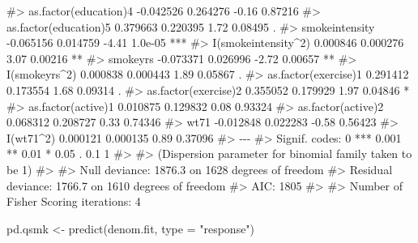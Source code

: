 \documentclass[
  10pt,
  a4paper,
]{book}
\newenvironment{Shaded}{\begin{snugshade}}{\end{snugshade}}
\newcommand{\AttributeTok}[1]{\textcolor[rgb]{0.40,0.45,0.13}{#1}}
\newcommand{\CommentTok}[1]{\textcolor[rgb]{0.37,0.37,0.37}{#1}}
\newcommand{\FunctionTok}[1]{\textcolor[rgb]{0.28,0.35,0.67}{#1}}
\newcommand{\NormalTok}[1]{\textcolor[rgb]{0.00,0.46,0.62}{#1}}
\newcommand{\OtherTok}[1]{\textcolor[rgb]{0.00,0.46,0.62}{#1}}
\newcommand{\StringTok}[1]{\textcolor[rgb]{0.13,0.47,0.30}{#1}}
\begin{document}
\begin{Shaded}
\begin{Highlighting}[]
\CommentTok{\#\textgreater{} as.factor(education)4 {-}0.042526   0.264276   {-}0.16  0.87216    }
\CommentTok{\#\textgreater{} as.factor(education)5  0.379663   0.220395    1.72  0.08495 .  }
\CommentTok{\#\textgreater{} smokeintensity        {-}0.065156   0.014759   {-}4.41  1.0e{-}05 ***}
\CommentTok{\#\textgreater{} I(smokeintensity\^{}2)    0.000846   0.000276    3.07  0.00216 ** }
\CommentTok{\#\textgreater{} smokeyrs              {-}0.073371   0.026996   {-}2.72  0.00657 ** }
\CommentTok{\#\textgreater{} I(smokeyrs\^{}2)          0.000838   0.000443    1.89  0.05867 .  }
\CommentTok{\#\textgreater{} as.factor(exercise)1   0.291412   0.173554    1.68  0.09314 .  }
\CommentTok{\#\textgreater{} as.factor(exercise)2   0.355052   0.179929    1.97  0.04846 *  }
\CommentTok{\#\textgreater{} as.factor(active)1     0.010875   0.129832    0.08  0.93324    }
\CommentTok{\#\textgreater{} as.factor(active)2     0.068312   0.208727    0.33  0.74346    }
\CommentTok{\#\textgreater{} wt71                  {-}0.012848   0.022283   {-}0.58  0.56423    }
\CommentTok{\#\textgreater{} I(wt71\^{}2)              0.000121   0.000135    0.89  0.37096    }
\CommentTok{\#\textgreater{} {-}{-}{-}}
\CommentTok{\#\textgreater{} Signif. codes:  0 \textquotesingle{}***\textquotesingle{} 0.001 \textquotesingle{}**\textquotesingle{} 0.01 \textquotesingle{}*\textquotesingle{} 0.05 \textquotesingle{}.\textquotesingle{} 0.1 \textquotesingle{} \textquotesingle{} 1}
\CommentTok{\#\textgreater{} }
\CommentTok{\#\textgreater{} (Dispersion parameter for binomial family taken to be 1)}
\CommentTok{\#\textgreater{} }
\CommentTok{\#\textgreater{}     Null deviance: 1876.3  on 1628  degrees of freedom}
\CommentTok{\#\textgreater{} Residual deviance: 1766.7  on 1610  degrees of freedom}
\CommentTok{\#\textgreater{} AIC: 1805}
\CommentTok{\#\textgreater{} }
\CommentTok{\#\textgreater{} Number of Fisher Scoring iterations: 4}

\NormalTok{pd.qsmk }\OtherTok{\textless{}{-}} \FunctionTok{predict}\NormalTok{(denom.fit, }\AttributeTok{type =} \StringTok{"response"}\NormalTok{)}


\end{Highlighting}
\end{Shaded}
\end{document}
